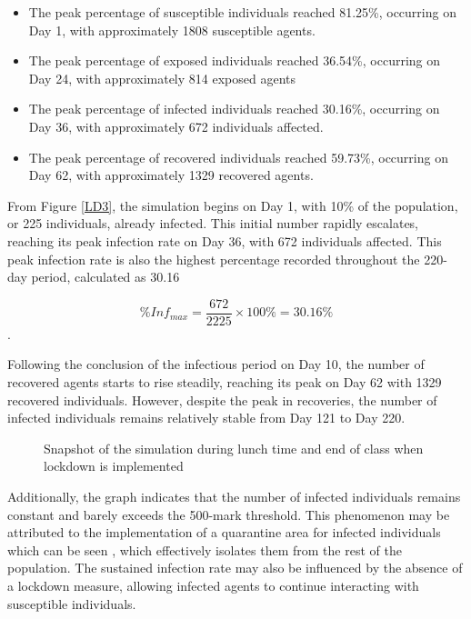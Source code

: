 \begin{itemize}

\item The peak percentage of susceptible individuals reached 81.25\%, occurring on Day 1, with approximately 1808 susceptible agents.
\item The peak percentage of exposed individuals reached 36.54\%, occurring on Day 24, with approximately 814 exposed agents
\item The peak percentage of infected individuals reached 30.16\%, occurring on Day 36, with approximately 672 individuals affected.
\item The peak percentage of recovered individuals reached 59.73\%, occurring on Day 62, with approximately 1329 recovered agents. 
\end{itemize}

From Figure \ref{LD3}, the simulation begins on Day 1, with 10\% of the population, or 225 individuals, already infected. This initial number rapidly escalates, reaching its peak infection rate on Day 36, with 672 individuals affected. This peak infection rate is also the highest percentage recorded throughout the 220-day period, calculated as 30.16%

\[ \%Inf_{max} = \frac{672}{2225} \times 100\% = 30.16\% \].

Following the conclusion of the infectious period on Day 10, the number of recovered agents starts to rise steadily, reaching its peak on Day 62 with 1329 recovered individuals. However, despite the peak in recoveries, the number of infected individuals remains relatively stable from Day 121 to Day 220.
\begin{figure}[H]
\centering
{}
\label{quarantine}
\quad
{}
\label{interaction}
\caption{Snapshot of the simulation during lunch time and end of class when lockdown is implemented}
\end{figure}

Additionally, the graph indicates that the number of infected individuals remains constant and barely exceeds the 500-mark threshold. This phenomenon may be attributed to the implementation of a quarantine area for infected individuals which can be seen , which effectively isolates them from the rest of the population. The sustained infection rate may also be influenced by the absence of a lockdown measure, allowing infected agents to continue interacting with susceptible individuals.

